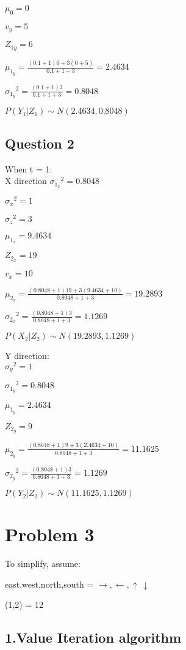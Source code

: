 \documentclass[12pt]{amsart}
\begin{document}
${\mu_{0}}= 0$

${v_{y}}= 5$

${Z_{1y}}= 6$

${\mu_{1_y}}=  \frac{(0.1+1)6+3(0+5)}{0.1+1+3} = 2.4634$

${\sigma_{1_y}}^{2}=  \frac{(0.1+1)3}{0.1+1+3} = 0.8048$

$P(Y_1|Z_1) \sim N(2.4634,0.8048)$
\subsection*{Question 2}
When t = 1: \\
X direction
${\sigma_{1_x}}^{2} = 0.8048$

${\sigma_{x}}^{2} = 1$

${\sigma_{z}}^{2} = 3$

${\mu_{1_x}}= 9.4634 $

${Z_{2_x}}= 19$

${v_{x}}= 10$

${\mu_{2_x}}=  \frac{(0.8048 +1)19+3( 9.4634 + 10)}{0.8048+1+3} = 19.2893$

${\sigma_{2_x}}^{2}=  \frac{(0.8048+1)3}{0.8048+1+3} = 1.1269$

$P(X_{2}|Z_2)  \sim N(19.2893, 1.1269)$

Y direction: \\
${\sigma_{y}}^{2} = 1$

${\sigma_{1_y}}^{2}=  0.8048$

${\mu_{1_y}}= 2.4634$

${Z_{2_y}}= 9$

${\mu_{2_y}}=  \frac{(0.8048 +1)9+3( 2.4634 + 10)}{0.8048+1+3} = 11.1625$

${\sigma_{2_y}}^{2}=  \frac{(0.8048+1)3}{0.8048+1+3} = 1.1269$

$P(Y_{2}|Z_2)  \sim N(11.1625, 1.1269)$

\section*{Problem 3}
To simplify, assume:

{east,west,north,south} = {$\rightarrow,\leftarrow,\uparrow\,\downarrow $}

(1,2) = 12


\subsection*{1.Value Iteration algorithm}
\end{document}
